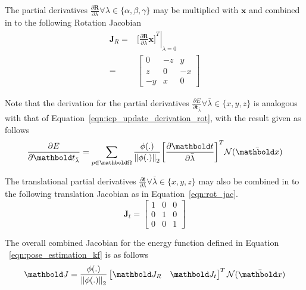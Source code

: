 The partial derivatives
\( \frac{\partial \bm{R}}{\partial \lambda} \forall \lambda \in \{\alpha, \beta, \gamma \} \) 
may be multiplied with \(\bm{x}\) and combined in to the following Rotation Jacobian
\begin{align}
  \label{eqn:rot_jac}
  \bm{J}_{R} ={}& \left. {\bigg[
    \frac{\partial \bm{R}}{\partial \lambda} \bm{x}
    \bigg]}^{T} \right\vert_{\lambda = 0} \\
  =&
  \begin{bmatrix}
    0 & -z & y \\
    z & 0 & -x \\
    -y & x & 0
  \end{bmatrix}
\end{align}

Note that the derivation for the partial derivatives
\(\frac{\partial E}{\partial \bm{t}_{\bar{\lambda}}} \forall \bar{\lambda} \in \{x, y, z\} \) 
is analogous with that of Equation~\ref{eqn:icp_update_derivation_rot}, with the result given as 
follows
\begin{equation}
  \label{eqn:icp_update_derivation_trans}
  \frac{\partial E}{\partial \bm{t}_{\bar{\lambda}}} =
  \sum_{p \in \bm{\Omega}}
  \frac{\phi(.)}{\norm{\phi(.)}}
  {\bigg[ \frac{\partial \bm{t}}{\partial \bar{\lambda}}\bigg]}^{T}
  \mathcal{N}(\bar{\bm{x}})
\end{equation}

The translational partial derivatives
\( \frac{\partial \bm{t}}{\partial \lambda} \forall \bar{\lambda} \in \{x, y, z\} \) may also 
be combined in to the following translation Jacobian as in Equation~\ref{eqn:rot_jac}.
\begin{equation}
  \label{eqn:trans_jac}
  \bm{J}_{t} =
  \begin{bmatrix}
    1 & 0 & 0 \\
    0 & 1 & 0 \\
    0 & 0 & 1
  \end{bmatrix}
\end{equation}

The overall combined Jacobian for the energy function defined in Equation
~\ref{eqn:pose_estimation_kf} is as follows
\begin{equation}
  \label{eqn:pose_jacobian}
  \bm{J} =
  \frac{\phi(.)}{\norm{\phi(.)}}
  \begin{bmatrix}
    \bm{J}_{R} & \bm{J}_{t}
  \end{bmatrix}^{T}
  \mathcal{N}(\bar{\bm{x}})
\end{equation}

